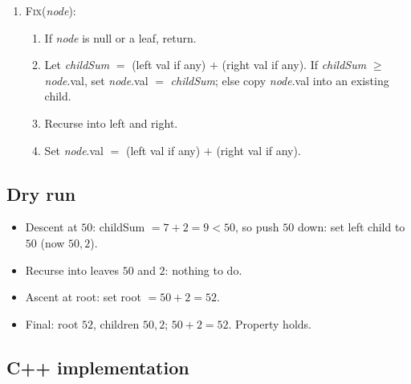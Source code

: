 \begin{enumerate}
  \item \textsc{Fix}(\textit{node}):
  \begin{enumerate}
    \item If \textit{node} is null or a leaf, return.
    \item Let \textit{childSum} $=$ (left val if any) $+$ (right val if
          any). If \textit{childSum} $\ge$ \textit{node}.val, set
          \textit{node}.val $=$ \textit{childSum}; else copy
          \textit{node}.val into an existing child.
    \item Recurse into left and right.
    \item Set \textit{node}.val $=$ (left val if any) $+$ (right val if
          any).
  \end{enumerate}
\end{enumerate}

\subsection*{Dry run}


\begin{itemize}
  \item Descent at $50$: childSum $=7+2=9<50$, so push $50$ down: set left
        child to $50$ (now $50,2$).
  \item Recurse into leaves $50$ and $2$: nothing to do.
  \item Ascent at root: set root $=50+2=52$.
  \item Final: root $52$, children $50,2$; $50+2=52$. Property holds.
\end{itemize}

\subsection*{C++ implementation}

